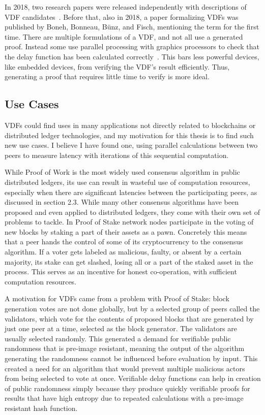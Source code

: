 In 2018, two research papers were released independently with descriptions of VDF candidates~\cite{Wesolowski2019-ro, Pietrzak2018-xs}. Before that, also in 2018, a paper formalizing VDFs was published by Boneh, Bonneau, Bünz, and Fisch, mentioning the term for the first time. There are multiple formulations of a VDF, and not all use a generated proof. Instead some use parallel processing with graphics processors to check that the delay function has been calculated correctly~\cite{Yakovenko2018-zn}. This bars less powerful devices, like embedded devices, from verifying the VDF's result efficiently. Thus, generating a proof that requires little time to verify is more ideal.~\cite{Boneh2018-ml}

\subsection{Use Cases}
VDFs could find uses in many applications not directly related to blockchains or distributed ledger technologies, and my motivation for this thesis is to find such new use cases. I believe I have found one, using parallel calculations between two peers to measure latency with iterations of this sequential computation.

While Proof of Work is the most widely used consensus algorithm in public distributed ledgers, its use can result in wasteful use of computation resources, especially when there are significant latencies between the participating peers, as discussed in section 2.3. While many other consensus algorithms have been proposed and even applied to distributed ledgers, they come with their own set of problems to tackle. In Proof of Stake network nodes participate in the voting of new blocks by staking a part of their assets as a pawn. Concretely this means that a peer hands the control of some of its cryptocurrency to the consensus algorithm. If a voter gets labeled as malicious, faulty, or absent by a certain majority, its stake can get slashed, losing all or a part of the staked asset in the process. This serves as an incentive for honest co-operation, with sufficient computation resources.

A motivation for VDFs came from a problem with Proof of Stake: block generation votes are not done globally, but by a selected group of peers called the validators, which vote for the contents of proposed blocks that are generated by just one peer at a time, selected as the block generator. The validators are usually selected randomly. This generated a demand for verifiable public randomness that is pre-image resistant, meaning the output of the algorithm generating the randomness cannot be influenced before evaluation by input. This created a need for an algorithm that would prevent multiple malicious actors from being selected to vote at once. Verifiable delay functions can help in creation of public randomness simply because they produce quickly verifiable proofs for results that have high entropy due to repeated calculations with a pre-image resistant hash function.

